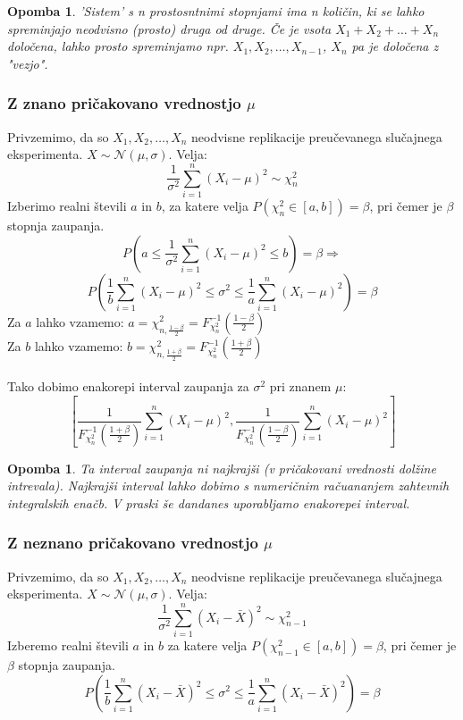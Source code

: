 \documentclass[11pt]{article}
\newtheorem{Opomba}[Izrek]{{\sc Opomba}}
\begin{document}
\begin{Opomba}
	'Sistem' s n prostosntnimi stopnjami ima n količin, ki se lahko spreminjajo neodvisno (prosto) druga od druge.
	Če je vsota $X_1+ X_2+ \ldots +X_n$ določena, lahko prosto spreminjamo npr. $X_1, X_2, \ldots ,X_{n-1}$, $X_n$ pa je določena z "vezjo".
\end{Opomba}
\subsubsection{Z znano pričakovano vrednostjo $\mu$}
Privzemimo, da so $X_1, X_2, \ldots , X_n$ neodvisne replikacije preučevanega slučajnega eksperimenta. $X\sim \mathcal{N}(\mu,\sigma)$. Velja:
$$\frac{1}{\sigma^2}\sum_{i = 1}^{n}{(X_i - \mu)^2} \sim \chi_n^2$$
Izberimo realni števili $a$ in $b$, za katere velja $P(\chi_n^2 \in [a,b]) = \beta$, pri čemer je $\beta$ stopnja zaupanja.
$$P(a \le \frac{1}{\sigma^2}\sum_{i = 1}^{n}{(X_i - \mu)^2} \le b) = \beta \Rightarrow$$
$$P\left( \frac{1}{b}\sum_{i = 1}^{n}{(X_i - \mu)^2}\le \sigma^2 \le  \frac{1}{a}\sum_{i = 1}^{n}{(X_i - \mu)^2}\right) = \beta$$
Za $a$ lahko vzamemo: $a = \chi^2_{n,\frac{1-\beta}{2}} = F_{\chi_n^2}^{-1}\left(\frac{1-\beta}{2}\right)$
\\
Za $b$ lahko vzamemo: $b = \chi^2_{n,\frac{1+\beta}{2}} = F_{\chi_n^2}^{-1}\left(\frac{1+\beta}{2}\right)$
\\
\\
Tako dobimo  enakorepi interval zaupanja za $\sigma^2$ pri znanem $\mu$:
$$\left[\frac{1}{F_{\chi_n^2}^{-1}\left(\frac{1+\beta}{2}\right)}\sum_{i = 1}^{n}{(X_i - \mu)^2}, \frac{1}{F_{\chi_n^2}^{-1}\left(\frac{1-\beta}{2}\right)}\sum_{i = 1}^{n}{(X_i - \mu)^2}\right]$$

\begin{Opomba}
	Ta interval zaupanja ni najkrajši (v pričakovani vrednosti dolžine intrevala). Najkrajši interval lahko dobimo s numeričnim račuananjem zahtevnih integralskih enačb. V praski še dandanes uporabljamo enakorepei interval.
\end{Opomba}
\subsubsection{Z neznano pričakovano vrednostjo $\mu$}
Privzemimo, da so $X_1, X_2, \ldots , X_n$ neodvisne replikacije preučevanega slučajnega eksperimenta. $X\sim \mathcal{N}(\mu,\sigma)$. Velja:
$$\frac{1}{\sigma^2}\sum_{i = 1}^{n}{(X_i - \bar{X})^2} \sim \chi_{n-1}^2$$
Izberemo realni števili $a$ in $b$ za katere velja $P(\chi_{n-1}^2 \in [a,b]) = \beta$, pri čemer je $\beta$ stopnja zaupanja.
$$P\left( \frac{1}{b}\sum_{i = 1}^{n}{(X_i - \bar{X})^2}\le \sigma^2 \le  \frac{1}{a}\sum_{i = 1}^{n}{(X_i - \bar{X})^2}\right) = \beta$$
\end{document}
